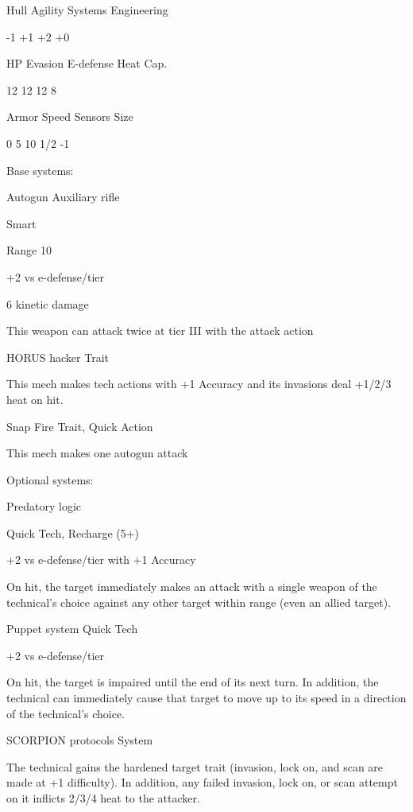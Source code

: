  Hull       Agility      Systems       Engineering 

 -1         +1           +2            +0 

 HP         Evasion      E-defense     Heat Cap. 

 12          12          12            8 

 Armor      Speed        Sensors       Size 

 0          5            10            1/2 -1 

Base systems:
 
Autogun  
Auxiliary rifle
 
Smart
 
Range 10
 
+2 vs e-defense/tier
 
6 kinetic damage
 
This weapon can attack twice at tier III with the attack action
 

HORUS hacker  
Trait
 
This mech makes tech actions with +1 Accuracy and its invasions deal +1/2/3 heat on hit.
 

Snap Fire  
Trait, Quick Action
 
This mech makes one autogun attack
 

Optional systems:  

Predatory logic
 
Quick Tech, Recharge (5+)
 
+2 vs e-defense/tier with +1 Accuracy
 

                                                                                                           


On hit, the target immediately makes an attack with a single weapon of the technical’s choice  
against any other target within range (even an allied target).
 

Puppet system  
Quick Tech
 
+2 vs e-defense/tier 
 
On hit, the target is impaired until the end of its next turn. In addition, the technical can  
immediately cause that target to move up to its speed in a direction of the technical’s choice.
 

SCORPION protocols  
System
 
The technical gains the hardened target trait (invasion, lock on, and scan are made at +1  
difficulty). In addition, any failed invasion, lock on, or scan attempt on it inflicts 2/3/4 heat to the  
attacker.
 

